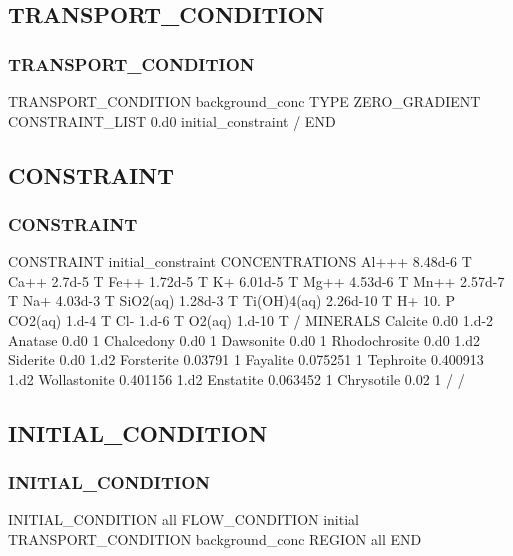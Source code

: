 \documentclass{beamer}
\newcommand\greencomment[1]{{{\color{green} #1}}}
\begin{document}
\subsection{TRANSPORT\_CONDITION}

\begin{frame}\frametitle{TRANSPORT\_CONDITION}

\begin{semiverbatim}
TRANSPORT_CONDITION background_conc
  TYPE ZERO_GRADIENT
  CONSTRAINT_LIST
    0.d0 initial_constraint
  /
END
\end{semiverbatim}

\end{frame}

\subsection{CONSTRAINT}

\begin{frame}\frametitle{CONSTRAINT}

\begin{semiverbatim}
CONSTRAINT initial_constraint
  CONCENTRATIONS
    Al+++         8.48d-6  T
    Ca++          2.7d-5   T
    Fe++          1.72d-5  T
    K+            6.01d-5  T
    Mg++          4.53d-6  T
    Mn++          2.57d-7  T
    Na+           4.03d-3  T
    SiO2(aq)      1.28d-3  T
    Ti(OH)4(aq)   2.26d-10 T
    H+            10.      P
    CO2(aq)       1.d-4    T
    Cl-           1.d-6    T
    O2(aq)        1.d-10   T
  /
\newpage
  MINERALS
    Calcite 0.d0 1.d-2
    Anatase 0.d0 1
    Chalcedony 0.d0 1
    Dawsonite 0.d0 1
    Rhodochrosite 0.d0 1.d2
    Siderite 0.d0 1.d2
    Forsterite 0.03791 1
    Fayalite 0.075251 1
    Tephroite 0.400913 1.d2
    Wollastonite 0.401156 1.d2
    Enstatite 0.063452 1
    Chrysotile 0.02 1
  /
/
\end{semiverbatim}

\end{frame}

\subsection{INITIAL\_CONDITION}

\begin{frame}[fragile]\frametitle{INITIAL\_CONDITION}

\begin{semiverbatim}
INITIAL_CONDITION all
  FLOW_CONDITION initial
  \greencomment{TRANSPORT_CONDITION background_conc}
  REGION all
END

\end{semiverbatim}

\end{frame}
\end{document}

